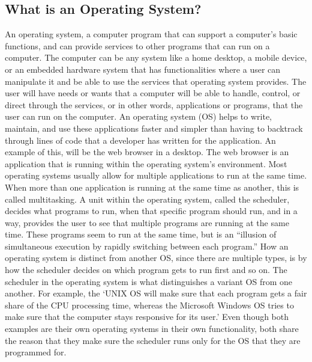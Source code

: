 \documentclass[12pt]{article}
\begin{document}
\subsection{What is an Operating System?}
An operating system, a computer program that can support a computer’s basic functions,
and can provide services to other programs that can run on a computer. The computer can be any
system like a home desktop, a mobile device, or an embedded hardware system that has
functionalities where a user can manipulate it and be able to use the services that operating
system provides. The user will have needs or wants that a computer will be able to handle,
control, or direct through the services, or in other words, applications or programs, that the user
can run on the computer. An operating system (OS) helps to write, maintain, and use these
applications faster and simpler than having to backtrack through lines of code that a developer
has written for the application. An example of this, will be the web browser in a desktop. The
web browser is an application that is running within the operating system’s environment.
Most operating systems usually allow for multiple applications to run at the same time.
When more than one application is running at the same time as another, this is called multitasking. A unit within the operating system, called the scheduler, decides what programs to run,
when that specific program should run, and in a way, provides the user to see that multiple
programs are running at the same time. These programs seem to run at the same time, but is an
“illusion of simultaneous execution by rapidly switching between each program.”
How an operating system is distinct from another OS, since there are multiple types, is by
how the scheduler decides on which program gets to run first and so on. The scheduler in the
operating system is what distinguishes a variant OS from one another. For example, the ‘UNIX
OS will make sure that each program gets a fair share of the CPU processing time, whereas the
Microsoft Windows OS tries to make sure that the computer stays responsive for its user.’ Even
though both examples are their own operating systems in their own functionality, both share the
reason that they make sure the scheduler runs only for the OS that they are programmed for. 
\end{document}
